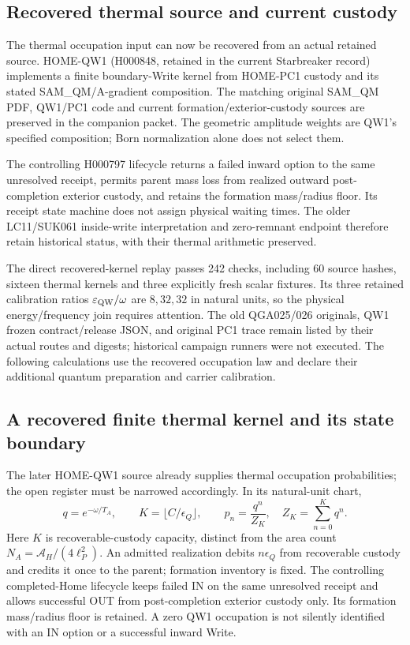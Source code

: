 \documentclass[10pt,twocolumn,letterpaper]{article}
\begin{document}
\subsection{Recovered thermal source and current custody}
The thermal occupation input can now be recovered from an actual retained
source. HOME-QW1 (H000848, retained in the current Starbreaker record)\cite{homeqw1}
implements a finite boundary-Write kernel from HOME-PC1 custody and its
stated SAM\_QM/A-gradient composition. The matching original SAM\_QM PDF,
QW1/PC1 code and current formation/exterior-custody sources are preserved
in the companion packet. The geometric amplitude weights are QW1's
specified composition; Born normalization alone does not select them.

The controlling H000797 lifecycle\cite{homeretry} returns a failed inward option to the
same unresolved receipt, permits parent mass loss from realized outward
post-completion exterior custody, and retains the formation mass/radius
floor. Its receipt state machine does not assign physical waiting times.
The older LC11/SUK061 inside-write interpretation and zero-remnant endpoint
therefore retain historical status, with their thermal arithmetic preserved.

The direct recovered-kernel replay passes 242 checks, including 60 source
hashes, sixteen thermal kernels and three explicitly fresh scalar fixtures.
Its three retained calibration ratios $\varepsilon_{\rm QW}/\omega$ are
$8,32,32$ in natural units, so the physical energy/frequency join requires
attention. The old QGA025/026 originals, QW1 frozen contract/release JSON,
and original PC1 trace remain listed by their actual routes and digests;
historical campaign runners were not executed. The following calculations
use the recovered occupation law and declare their additional quantum
preparation and carrier calibration.


\subsection{A recovered finite thermal kernel and its state boundary}
The later HOME-QW1 source already supplies thermal occupation probabilities;
the open register must be narrowed accordingly. In its natural-unit chart,
\begin{equation}
 q=e^{-\omega/T_A},\qquad
 K=\lfloor C/\epsilon_Q\rfloor,\qquad
 p_n=\frac{q^n}{Z_K},\quad Z_K=\sum_{n=0}^Kq^n .
\end{equation}
Here $K$ is recoverable-custody capacity, distinct from the area count
$N_A=\mathcal A_H/(4\ell_P^2)$. An admitted realization debits
$n\epsilon_Q$ from recoverable custody and credits it once to the parent;
formation inventory is fixed. The controlling completed-Home lifecycle
keeps failed IN on the same unresolved receipt and allows successful OUT
from post-completion exterior custody only. Its formation mass/radius
floor is retained. A zero QW1 occupation is not silently identified with
an IN option or a successful inward Write.
\end{document}
